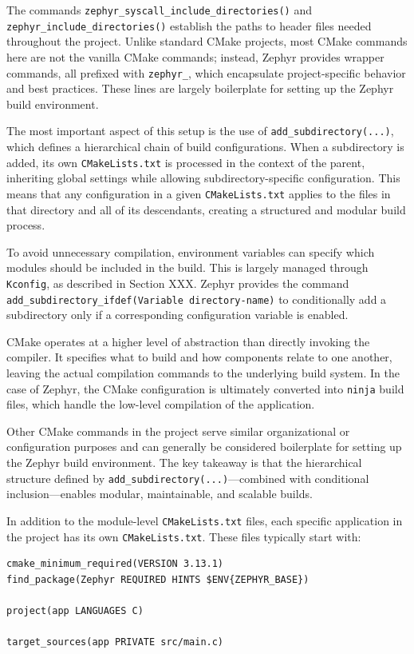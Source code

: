The commands \texttt{zephyr\_syscall\_include\_directories()} and \texttt{zephyr\_include\_directories()} establish the paths to header files needed throughout the project. Unlike standard CMake projects, most CMake commands here are not the vanilla CMake commands; instead, Zephyr provides wrapper commands, all prefixed with \texttt{zephyr\_}, which encapsulate project-specific behavior and best practices. These lines are largely boilerplate for setting up the Zephyr build environment.

The most important aspect of this setup is the use of \texttt{add\_subdirectory(...)}, which defines a hierarchical chain of build configurations. When a subdirectory is added, its own \texttt{CMakeLists.txt} is processed in the context of the parent, inheriting global settings while allowing subdirectory-specific configuration. This means that any configuration in a given \texttt{CMakeLists.txt} applies to the files in that directory and all of its descendants, creating a structured and modular build process.

To avoid unnecessary compilation, environment variables can specify which modules should be included in the build. This is largely managed through \texttt{Kconfig}, as described in Section XXX. Zephyr provides the command \texttt{add\_subdirectory\_ifdef(Variable directory-name)} to conditionally add a subdirectory only if a corresponding configuration variable is enabled.

CMake operates at a higher level of abstraction than directly invoking the compiler. It specifies what to build and how components relate to one another, leaving the actual compilation commands to the underlying build system. In the case of Zephyr, the CMake configuration is ultimately converted into \texttt{ninja} build files, which handle the low-level compilation of the application.

Other CMake commands in the project serve similar organizational or configuration purposes and can generally be considered boilerplate for setting up the Zephyr build environment. The key takeaway is that the hierarchical structure defined by \texttt{add\_subdirectory(...)}—combined with conditional inclusion—enables modular, maintainable, and scalable builds.

In addition to the module-level \texttt{CMakeLists.txt} files, each specific application in the project has its own \texttt{CMakeLists.txt}. These files typically start with:

\begin{verbatim}
cmake_minimum_required(VERSION 3.13.1)
find_package(Zephyr REQUIRED HINTS $ENV{ZEPHYR_BASE})

project(app LANGUAGES C)

target_sources(app PRIVATE src/main.c)
\end{verbatim}

